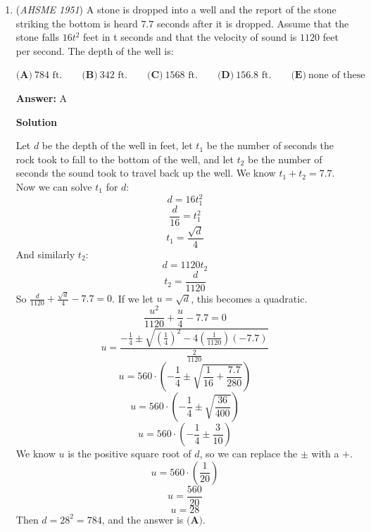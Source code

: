 \begin{enumerate}
 \textbf{Answer: }A



\textbf{Solution}

A grade is the rise divided by the horizontal length for a given segment of track. This means we can get the horizontal length of the track by dividing the rise by the grade.

 At a $3\%$ grade, the horizontal track length is $20000$ feet. At a $2\%$ grade, the horizontal track length is $30000$ feet. The difference is $10000$ feet of horizontal track. Compared to $10000$, $600$ feet is insignificant and can be safely covered by the problem's use of the word "approximately." Therefore, the answer is $\boxed{\textbf{(A)}}$.

 


	\item (\textit{AHSME 1951}) A stone is dropped into a well and the report of the stone striking the bottom is heard $7.7$ seconds after it is dropped. Assume that the stone falls $16t^2$ feet in t seconds and that the velocity of sound is $1120$ feet per second. The depth of the well is:


 $\textbf{(A)}\ 784\text{ ft.}\qquad\textbf{(B)}\ 342\text{ ft.}\qquad\textbf{(C)}\ 1568\text{ ft.}\qquad\textbf{(D)}\ 156.8\text{ ft.}\qquad\textbf{(E)}\ \text{none of these}$

 \textbf{Answer: }A



\textbf{Solution}

Let $d$ be the depth of the well in feet, let $t_1$ be the number of seconds the rock took to fall to the bottom of the well, and let $t_2$ be the number of seconds the sound took to travel back up the well. We know $t_1+t_2=7.7$. Now we can solve $t_1$ for $d$:
 \[d=16t_1^2\]
 \[\frac{d}{16}=t_1^2\]
 \[t_1=\frac{\sqrt{d}}4\]And similarly $t_2$:
 \[d=1120t_2\]
 \[t_2=\frac{d}{1120}\]So $\frac{d}{1120}+\frac{\sqrt{d}}4-7.7=0$. If we let $u=\sqrt{d}$, this becomes a quadratic. 
 \[\frac{u^2}{1120}+\frac{u}4-7.7=0\]
 \[u=\frac{-\frac14\pm\sqrt{\left(\frac14\right)^2-4(\frac1{1120})(-7.7)}}{\frac2{1120}}\]
 \[u=560\cdot\left(-\frac14\pm\sqrt{\frac1{16}+\frac{7.7}{280}}\right)\]
 \[u=560\cdot\left(-\frac14\pm\sqrt{\frac{36}{400}}\right)\]
 \[u=560\cdot\left(-\frac14\pm\frac3{10}\right)\]We know $u$ is the positive square root of $d$, so we can replace the $\pm$ with a $+$.
 \[u=560\cdot\left(\frac1{20}\right)\]
 \[u=\frac{560}{20}\]
 \[u=28\]Then $d=28^2=784$, and the answer is $\boxed{\textbf{(A)}}$.


\end{enumerate}
